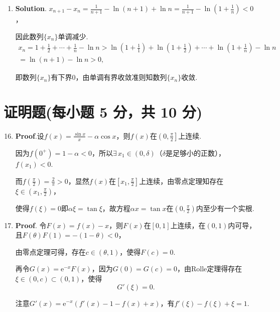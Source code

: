 \documentclass[../Main.tex]{subfiles}
\begin{document}
\begin{enumerate}
          解得
          \[
              \frac{\mathrm{d}^{2} x}{\mathrm{d}y^{2}}=\frac{\frac{\mathrm{d}x}{\mathrm{d}y}-\frac{f''(\ln
                      x)}{x}\left(\frac{\mathrm{d}x}{\mathrm{d}y}\right)^{2}}{f'(\ln x)}=\frac{x(f'(\ln
                  x)-f''(\ln x))}{(f'(\ln x))^{3}}.
          \]

    \item \textbf{Solution}. $x_{n+1}-x_{n}=\frac{1}{n+1}-\ln(n+1)+\ln n=\frac{1}{n+1}
              -\ln\left(1+\frac{1}{n}\right)<0$，

          因此数列$\{x_{n}\}$单调减少.
          \[
              \begin{gathered}
                  x_n=1+\frac{1}{2}+\cdots+\frac{1}{n}-\ln n>\ln\left(1+\frac{1}{1}\right)+\ln\left(1+\frac{1}{2}\right)+\cdots+\ln\left(1+\frac{1}{n}\right)-\ln
                  n\\
                  =\ln(n+1)-\ln n>0,
              \end{gathered}
          \]

          即数列$\{x_{n}\}$有下界0，由单调有界收敛准则知数列$\{x_{n}\}$收敛.
\end{enumerate}

\section{证明题(每小题 5 分，共 10 分)}
\begin{enumerate}
    \setcounter{enumi}{15}
    \item \textbf{Proof}.设$f(x)=\frac{\sin x}{x}-\alpha\cos x$，则$f(x)$在$\left
              (0,\frac{\pi}{2}\right]$上连续.

          因为$f(0^{+})=1-\alpha<0$，所以$\exists\,x_{1}\in(0,\delta)$（$\delta$是足够小的正数），$f
              (x_{1})<0$.

          而$f\left(\frac{\pi}{2}\right)=\frac{2}{\pi}>0$，显然$f(x)$在$\left[x_{1},\frac{\pi}{2}
                  \right]$上连续，由零点定理知存在$\xi\in\left(x_{1},\frac{\pi}{2}\right)$，

          使得$f(\xi)=0$即$\alpha\xi=\tan\xi$，故方程$\alpha x=\tan x$在$\left(0,\frac{\pi}{2}
              \right)$内至少有一个实根.

    \item \textbf{Proof}. 令$F(x)=f(x)-x$，则$F(x)$在$[0,1]$上连续，在$(0,1)$内可导，且$F
              (\theta)F(1)=-(1-\theta)<0$，

          由零点定理可得，存在$c\in(\theta,1)$，使得$F(c)=0$.

          再令$G(x)=\mathrm{e}^{-x}F(x)$，因为$G(0)=G(c)=0$，由Rolle定理得存在$\xi\in
              (0,c)\subset(0,1)$，使得
          \[
              G'(\xi)=0.
          \]

          注意$G'(x)=\mathrm{e}^{-x}(f'(x)-1-f(x)+x)$，有$f'(\xi)-f(\xi)+\xi=1$.
\end{enumerate}
\end{document}
